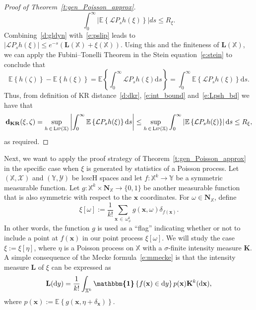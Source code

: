 \documentclass[AHL,Unicode,longabstracts]{cedram}
\newcommand*\bL{\mathbf{L}}
\newcommand*\bN{\mathbf{N}}
\newcommand*\bK{\mathbf{K}}
\newcommand{\bx}{\mathbf{x}}
\newcommand*\dkr{\mathbf{d_{KR}}}
\newcommand*\X{\mathbb{X}}
\newcommand*\Y{\mathbb{Y}}
\newcommand{\E}{\mathbb{E}}
\newcommand*\cL{\mathcal{L}}
\newcommand*\cX{\mathcal{X}}
\newcommand*\cY{\mathcal{Y}}
\newcommand*\cLip{\textsc{Lip}}
\newcommand*\md{\mathrm{d}}
\newcommand{\mean}[1] {\E\left\{{#1}\right\}}
\newcommand{\ind}{\boldsymbol{\mathbbm{1}}}
\newcommand{\set}[1]{\left\{#1\right\}}
\begin{document}
\begin{proof}[Proof of Theorem~\ref{t:gen_Poisson_approx}]
\begin{equation}
\int_0^{\infty} \left|\mean{\cL P_sh(\xi)}\right|ds \leq R_{\xi}.
\end{equation}
Combining~\eqref{d:gldyn} with~\eqref{e:pslip} leads to $|\cL P_sh(\xi)| \leq e^{-s}(\bL(\X) + \xi(\X))$. Using this and the finiteness of $\bL(\X)$, we can apply the Fubini--Tonelli Theorem in the Stein equation~\eqref{e:stein} to conclude that
\begin{equation}\label{e:int_bound}
\mean{h(\zeta)} - \mean{h(\xi)} = \mean{\int_0^{\infty}\cL P_sh(\xi) \md s} = \int_0^{\infty}\mean{\cL P_sh(\xi)} \md s.
\end{equation}
Thus, from definition of KR distance~\eqref{d:dkr}, \eqref{e:int_bound} and~\eqref{e:Lpsh_bd} we have that
\begin{align*}
\dkr(\xi,\zeta) = \sup_{h\,\in\,\cLip(\X)} \left|\int_0^{\infty}\mean{\cL P_sh(\xi)} \md s\right|
\leq \sup_{h\,\in\,\cLip(\X)} \int_0^{\infty}\left|\mean{\cL P_sh(\xi)}\right| \md s \leq R_{\xi},
\end{align*}
as required.
\end{proof}

Next, we want to apply the proof strategy of Theorem~\ref{t:gen_Poisson_approx} in the specific case when $\xi$ is generated by statistics of a Poisson process. Let $(\X,\cX)$ and $(\Y,\cY)$ be lcscH spaces and let $f:\X^k \to \Y$ be a symmetric measurable function. Let $g : \X^k \times \bN_{\X} \to \{0,1\}$ be another measurable function that is also symmetric with respect to the $\bx$ coordinates. For $\omega\in \bN_{\X}$, define
\begin{equation}\label{e:defn_varphi}
\xi[\omega] := \frac{1}{k!}\sum_{\bx\,\in\, \omega^k_{\ne}}g(\bx,\omega)\delta_{f(\bx)}.
\end{equation}
In other words, the function $g$ is used as a ``flag'' indicating whether or not to include a point at $f(\bx)$ in our point process $\xi[\omega]$. We will study the case $\xi :=\xi[\eta]$, where $\eta$ is a Poisson process on $\X$ with a $\sigma$-finite intensity measure $\bK$. A simple consequence of the Mecke formula~\eqref{e:mmecke} is that the intensity measure $\bL$ of $\xi$ can be expressed as
\begin{equation}\label{e:int_L}
\bL(\md y) = \frac{1}{k!}\int_{\X^k} \ind\set{f(\bx) \in \md y} p(\bx) \bK^k(\md \bx),
\end{equation}
where $p(\bx) := \mean{g(\bx,\eta+\delta_{\bx})}$.
\end{document}
